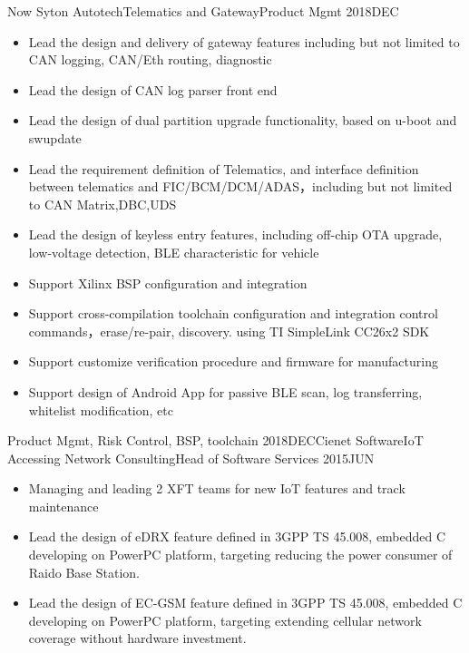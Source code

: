 %
%


 
\begin{experiences}
	
	\experience
	{Now} {Syton Autotech}{Telematics and Gateway}{Product Mgmt}
	{2018DEC}    {
		\begin{itemize}
			\item Lead the design and delivery of gateway features including but not limited to CAN logging, CAN/Eth routing, diagnostic
			\item Lead the design of CAN log parser front end
			\item Lead the design of dual partition upgrade functionality, based on u-boot and swupdate
			\item Lead the requirement definition of Telematics, and interface definition between telematics and FIC/BCM/DCM/ADAS，including but not limited to CAN Matrix,DBC,UDS
			\item Lead the design of keyless entry features, including off-chip OTA upgrade, low-voltage detection, BLE characteristic for vehicle 
			\item Support Xilinx BSP configuration and integration
			\item Support cross-compilation toolchain configuration and integration
control commands，erase/re-pair, discovery. using TI SimpleLink CC26x2 SDK
			\item Support customize verification procedure and firmware for manufacturing
			\item Support design of Android App for passive BLE scan, log transferring, whitelist modification, etc
		\end{itemize}
	}
	{Product Mgmt, Risk Control, BSP, toolchain}
	\emptySeparator	
	\experience
	{2018DEC}{Cienet Software}{IoT Accessing Network Consulting}{Head of Software Services}
	{2015JUN} {
		\begin{itemize}
			\item Managing and leading 2 XFT teams for new IoT features and track maintenance
			\item Lead the design of eDRX feature defined in 3GPP TS 45.008, embedded C developing on PowerPC platform, targeting reducing the power consumer of Raido Base Station.
			\item Lead the design of EC-GSM feature defined in 3GPP TS 45.008, embedded C developing on PowerPC platform, targeting extending cellular network coverage without hardware investment.

\end{itemize}}
\end{experiences}
